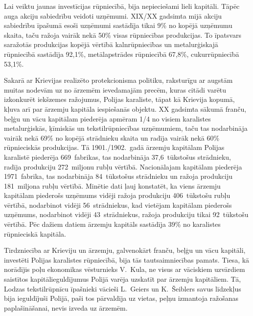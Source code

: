 \documentclass[twoside,a5paper,12pt,fleqn,openany]{extbook}
\begin{document}
Lai veiktu jaunas investīcijas rūpniecībā, bija nepieciešami lieli kapitāli. Tāpēc auga akciju sabiedrību veidoti uzņēmumi. XIX/XX gadsimta mijā akciju sabiedrību īpašumā esoši uzņēmumi sastādīja tikai 9\% no kopējā uzņēmumu skaita, taču ražoja vairāk nekā 50\% visas rūpniecības produkcijas. To īpatsvars saražotās produkcijas kopējā vērtībā kalnrūpniecības un metalurģiskajā rūpniecībā sastādīja 92,1\%, metālapstrādes rūpniecībā 67,8\%, cukurrūpniecībā 53,1\%.

Sakarā ar Krievijas realizēto protekcionisma politiku, raksturīgu ar augstām muitas nodevām uz no ārzemēm ievedamajām precēm, kuras citādi varētu izkonkurēt iekšzemes ražojumus, Polijas karaliste, tāpat kā Krievija kopumā, kļuva arī par ārzemju kapitāla iespiešanās objektu. XX gadsimta sākumā franču, beļģu un vācu kapitālam piederēja apmēram 1/4 no visiem karalistes metalurģiskās, ķīmiskās un tekstilrūpniecības uzņēmumiem, taču tas nodarbināja vairāk nekā 69\% no kopējā strādnieku skaita un radīja vairāk nekā 60\% rūpnieciskās produkcijas. Tā 1901./1902.~gadā ārzemju kapitālam Polijas karalistē piederēja 669~fabrikas, tas nodarbināja 37,6~tūkstošus strādnieku, radīja produkciju 272~miljonu rubļu vērtībā. Nacionālajam kapitālam piederēja 1971~fabrika, tas nodarbināja 84~tūkstošus strādnieku un ražoja produkciju 181~miljona rubļu vērtībā. Minētie dati ļauj konstatēt, ka viens ārzemju kapitālam piederošs uzņēmums vidēji ražoja produkciju 406~tūkstošu rubļu vērtībā, nodarbinot vidēji 56~strādniekus, kad vietējam kapitālam piederošs uzņēmums, nodarbinot vidēji 43~strādniekus, ražoja produkciju tikai 92~tūkstošu vērtībā. Pēc dažiem datiem ārzemju kapitāls sastādīja 39\% no karalistes rūpnieciskā kapitāla.

Tirdzniecība ar Krieviju un ārzemju, galvenokārt franču, beļģu un vācu kapitāli, investēti Polijas karalistes rūpniecībā, bija tās tautsaimniecības pamats. Tiesa, kā norādījis poļu ekonomikas vēsturnieks V.~Kula, ne visus ar vāciskiem uzvārdiem saistītos kapitālieguldījumus Polijā varēja uzskatīt par ārzemju kapitāliem. Tā, Lodzas tekstilrūpnīcu īpašnieki vācieši L.~Geiers un K.~Šeiblers savus līdzekļus bija ieguldījuši Polijā, paši tos pārvaldīja uz vietas, peļņu izmantoja ražošanas paplašināšanai, nevis izveda uz ārzemēm.
\end{document}
